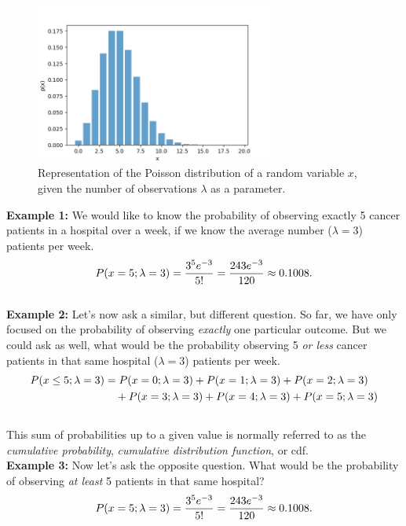 \documentclass{book}
\begin{document}
\begin{figure}[ht]
    \centering
    \includegraphics[width=0.7\textwidth]{figures/chapter2/poisson.png}
    \caption{Representation of the Poisson distribution of a random variable $x$, given the number of observations $\lambda$ as a parameter.}
    \label{fig:random}
\end{figure}

\textbf{Example 1:} We would like to know the probability of observing exactly 5 cancer patients in a hospital over a week, if we know the average number ($\lambda = 3$) patients per week.
\begin{equation}
    P(x=5; \lambda = 3) = \frac{3^5 e^{-3}}{5!} = \frac{243 e^{-3}}{120} \approx 0.1008. \notag
\end{equation}\\

\textbf{Example 2:} Let's now ask a similar, but different question. So far, we have only focused on the probability of observing \textit{exactly} one particular outcome. But we could ask as well, what would be the probability observing 5 \textit{or less} cancer patients in that same hospital ($\lambda = 3$) patients per week.
\begin{align}
    P(x \leq 5; \lambda = 3) &= P(x=0; \lambda = 3) + P(x=1; \lambda = 3) + P(x=2; \lambda = 3) \notag \\
    &\quad + P(x=3; \lambda = 3) + P(x=4; \lambda = 3) + P(x=5; \lambda = 3) \notag
\end{align}\\

This sum of probabilities up to a given value is normally referred to as the \textit{cumulative probability}, \textit{cumulative distribution function}, or cdf.\\

\textbf{Example 3:} Now let's ask the opposite question. What would be the probability of observing \textit{at least} 5 patients in that same hospital?
\begin{equation}
    P(x=5; \lambda = 3) = \frac{3^5 e^{-3}}{5!} = \frac{243 e^{-3}}{120} \approx 0.1008. \notag
\end{equation}
\end{document}
